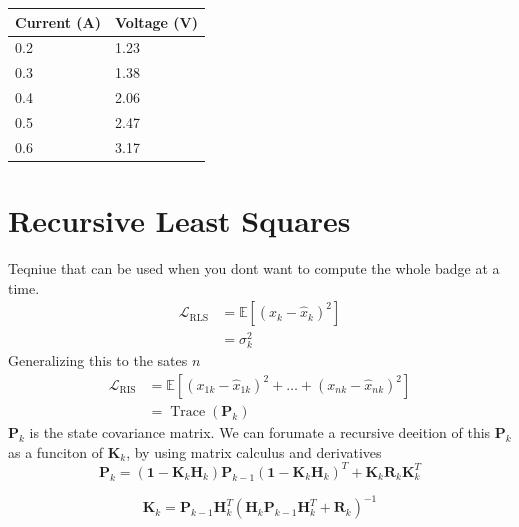 \documentclass{article}
\begin{document}
\begin{table}[h!]
\begin{tabular}{| l | l |}
\hline
Current (A) & Voltage (V) \\
\hline
0.2         & 1.23        \\
0.3         & 1.38        \\
0.4         & 2.06        \\
0.5         & 2.47        \\
0.6         & 3.17       \\
\hline
\end{tabular}
\end{table}
\newpage


\section*{Recursive Least Squares}
Teqniue that can be used when you dont want to compute the whole badge at a time.
\begin{equation}
\begin{aligned} \mathscr{L}_{\mathrm{RLS}} &=\mathbb{E}\left[\left(x_{k}-\hat{x}_{k}\right)^{2}\right] \\ &=\sigma_{k}^{2} \end{aligned}
\end{equation}
Generalizing this to the sates $n$
\begin{equation}
\begin{aligned} \mathscr{L}_{\mathrm{RIS}} &=\mathbb{E}\left[\left(x_{1 k}-\hat{x}_{1 k}\right)^{2}+\ldots+\left(x_{n k}-\hat{x}_{n k}\right)^{2}\right] \\ &=\operatorname{Trace}\left(\mathbf{P}_{k}\right) \end{aligned}
\end{equation}
$\mathbf{P}_{k}$ is the state covariance matrix. We can forumate a recursive
deeition of this $\mathbf{P}_{k}$ as a funciton of $\mathbf{K}_{k}$, by using matrix 
calculus and derivatives
\begin{equation}
\mathbf{P}_{k}=\left(\mathbf{1}-\mathbf{K}_{k} \mathbf{H}_{k}\right) \mathbf{P}_{k-1}\left(\mathbf{1}-\mathbf{K}_{k} \mathbf{H}_{k}\right)^{T}+\mathbf{K}_{k} \mathbf{R}_{k} \mathbf{K}_{k}^{T}
\end{equation}

\begin{equation}
\mathbf{K}_{k}=\mathbf{P}_{k-1} \mathbf{H}_{k}^{T}\left(\mathbf{H}_{k} \mathbf{P}_{k-1} \mathbf{H}_{k}^{T}+\mathbf{R}_{k}\right)^{-1}
\end{equation}
\end{document}
